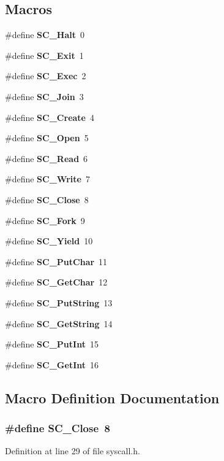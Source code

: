 \subsection*{Macros}
\begin{DoxyCompactItemize}
\item 
\#define {\bf S\+C\+\_\+\+Halt}~0
\item 
\#define {\bf S\+C\+\_\+\+Exit}~1
\item 
\#define {\bf S\+C\+\_\+\+Exec}~2
\item 
\#define {\bf S\+C\+\_\+\+Join}~3
\item 
\#define {\bf S\+C\+\_\+\+Create}~4
\item 
\#define {\bf S\+C\+\_\+\+Open}~5
\item 
\#define {\bf S\+C\+\_\+\+Read}~6
\item 
\#define {\bf S\+C\+\_\+\+Write}~7
\item 
\#define {\bf S\+C\+\_\+\+Close}~8
\item 
\#define {\bf S\+C\+\_\+\+Fork}~9
\item 
\#define {\bf S\+C\+\_\+\+Yield}~10
\item 
\#define {\bf S\+C\+\_\+\+Put\+Char}~11
\item 
\#define {\bf S\+C\+\_\+\+Get\+Char}~12
\item 
\#define {\bf S\+C\+\_\+\+Put\+String}~13
\item 
\#define {\bf S\+C\+\_\+\+Get\+String}~14
\item 
\#define {\bf S\+C\+\_\+\+Put\+Int}~15
\item 
\#define {\bf S\+C\+\_\+\+Get\+Int}~16
\end{DoxyCompactItemize}


\subsection{Macro Definition Documentation}
\subsubsection[{S\+C\+\_\+\+Close}]{\setlength{\rightskip}{0pt plus 5cm}\#define S\+C\+\_\+\+Close~8}\label{syscall_8h_acb19f3910e57cdd63dff1747435e2e5b}


Definition at line 29 of file syscall.\+h.

